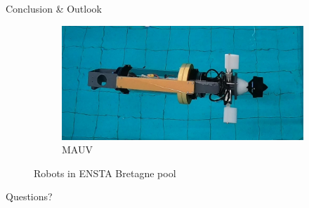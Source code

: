 \documentclass[10pt, xcolor={usenames, dvipsnames}]{beamer}
\begin{document}
\begin{frame}{Conclusion \& Outlook}
\begin{minipage}[c]{.35\textwidth}
\begin{figure}
\begin{subfigure}{\textwidth}
                        \includegraphics[width=\textwidth]{imgs/MAUV}
                        \caption{MAUV}
                    \end{subfigure}
                    \caption{Robots in ENSTA Bretagne pool}
                \end{figure}
            \end{minipage}
        \end{frame}

        \appendix

        \begin{frame}[standout]
            Questions?
        \end{frame}

        \maketitle
\end{document}
